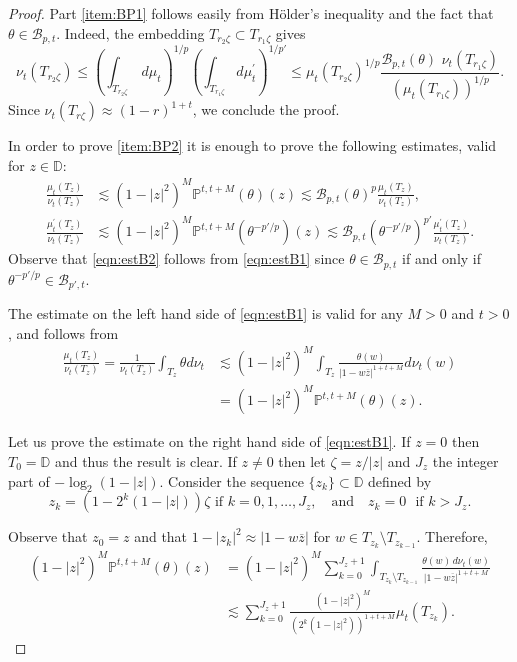 \documentclass[12pt,twoside,leqno,final]{amsart}
\theoremstyle{plain}
\begin{document}
\begin{proof}
Part \eqref{item:BP1} follows easily from H\"older's inequality and the fact that $\theta\in {{\mathcal B}}_{p,t}$. Indeed,  the embedding 
$T_{r_2{\zeta}}\subset T_{r_1{\zeta}}$ gives
$$
\nu_t(T_{r_2{\zeta}})\le\left(\int_{T_{r_2{\zeta}}}  \, d\mu_t\right)^{1/p}\left(\int_{T_{r_1{\zeta}}} d\mu^\prime_t\right)^{1/p'}
\le \mu_t(T_{r_2{\zeta}})^{1/p}\frac{{{\mathcal B}}_{p,t}(\theta)\,\,\nu_t(T_{r_1{\zeta}})}{(\mu_t(T_{r_1{\zeta}}))^{1/p}}.
$$
Since $\nu_t(T_{r{\zeta}})\approx (1-r)^{1+t}$, we conclude the proof.

In order to prove \eqref{item:BP2} it is enough to prove  the following estimates, valid for $z\in{{\mathbb D}}$:
\begin{align}
\label{eqn:estB1} \frac{\mu_t(T_z)}{\nu_t(T_z)}&\lesssim (1-|z|^2)^M{\mathbb{P}}^{t,t+M}(\theta)(z)\lesssim 
{{\mathcal B}}_{p,t}(\theta)^p\frac{\mu_t(T_z)}{\nu_t(T_z)},\\
\label{eqn:estB2} \frac{\mu^\prime_t(T_z)}{\nu_t(T_z)}&\lesssim  (1-|z|^2)^M{\mathbb{P}}^{t,t+M}(\theta^{-p'/p})(z)\lesssim 
{{\mathcal B}}_{p,t}(\theta^{-p'/p})^{p'}\frac{\mu^\prime_t(T_z)}{\nu_t(T_z)}.
\end{align}
Observe that \eqref{eqn:estB2}  follows from \eqref{eqn:estB1} since $\theta\in {{\mathcal B}}_{p,t}$ 
if and only if  $\theta^{-p'/p}\in {{\mathcal B}}_{p',t}$.

The estimate on the left hand side of  \eqref{eqn:estB1}  is valid for  any $M>0$ and $t>0$, and follows from 
\begin{align*}
\frac{\mu_t(T_z)}{\nu_t(T_{z})}=\frac{1}{\nu_t(T_{z})}\int_{T_{z}}\theta d\nu_t
&\lesssim  (1-|z|^2)^M\int_{T_{z}} \frac{\theta(w)}{|1-w\bar z|^{1+t+M}}d\nu_t(w)\\
&= (1-|z|^2)^M {\mathbb{P}}^{t,t+M}(\theta)(z).
\end{align*}

Let us prove the estimate on the right hand side of \eqref{eqn:estB1}.
If $z=0$ then $T_0={{\mathbb D}}$ and thus the result is clear. If $z\ne 0$ then let ${\zeta}=z/|z|$ and  $J_z$  the integer part of $-\log_2(1-|z|)$.
Consider the sequence $\{z_k\}\subset {{\mathbb D}}$ defined by
$$
z_k=(1-2^k(1-|z|)){\zeta}\,\,\text{if}\,\, k=0,1,\ldots,J_z,\quad \text{and}\quad z_k=0\,\,\text{ if } k>J_z.
$$

 Observe that $z_0=z$ and that  $1-|z_k|^2\approx |1-w\overline{z}|$ for $w\in T_{z_k}\setminus T_{z_{k-1}}$. 
Therefore,
\begin{align*}
(1-|z|^2)^M {\mathbb{P}}^{t,t+M}(\theta)(z)
&=(1-|z|^2)^M\sum_{k=0}^{J_z+1} \int_{T_{z_k}\setminus T_{z_{k-1}}}\frac{\theta(w)\,d\nu_t(w)}{|1-w\overline{z}|^{1+t+M}}\\
&\lesssim \sum_{k=0}^{J_z+1} \frac{(1-|z|^2)^M}{(2^k(1-|z|^2))^{1+t+M}}\mu_t(T_{z_k}).
\end{align*}


\end{proof}
\end{document}
